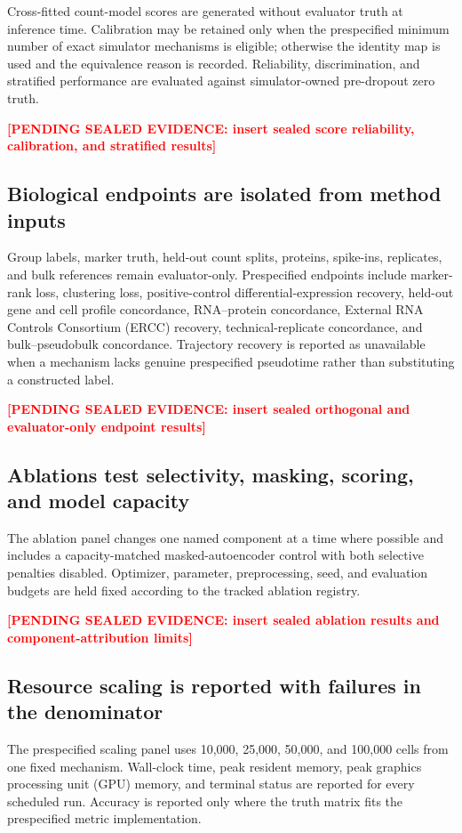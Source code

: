 \documentclass[pdflatex,sn-vancouver-num,referee,lineno]{sn-jnl}
\newcommand{\PendingResult}[1]{\textcolor{red}{\textbf{[PENDING SEALED EVIDENCE: #1]}}}
\begin{document}
Cross-fitted count-model scores are generated without evaluator truth at inference time. Calibration may be retained only when the prespecified minimum number of exact simulator mechanisms is eligible; otherwise the identity map is used and the equivalence reason is recorded. Reliability, discrimination, and stratified performance are evaluated against simulator-owned pre-dropout zero truth.

\PendingResult{insert sealed score reliability, calibration, and stratified results}

\subsection{Biological endpoints are isolated from method inputs}

Group labels, marker truth, held-out count splits, proteins, spike-ins, replicates, and bulk references remain evaluator-only. Prespecified endpoints include marker-rank loss, clustering loss, positive-control differential-expression recovery, held-out gene and cell profile concordance, RNA--protein concordance, External RNA Controls Consortium (ERCC) recovery, technical-replicate concordance, and bulk--pseudobulk concordance. Trajectory recovery is reported as unavailable when a mechanism lacks genuine prespecified pseudotime rather than substituting a constructed label.

\PendingResult{insert sealed orthogonal and evaluator-only endpoint results}

\subsection{Ablations test selectivity, masking, scoring, and model capacity}

The ablation panel changes one named component at a time where possible and includes a capacity-matched masked-autoencoder control with both selective penalties disabled. Optimizer, parameter, preprocessing, seed, and evaluation budgets are held fixed according to the tracked ablation registry.

\PendingResult{insert sealed ablation results and component-attribution limits}

\subsection{Resource scaling is reported with failures in the denominator}

The prespecified scaling panel uses 10,000, 25,000, 50,000, and 100,000 cells from one fixed mechanism. Wall-clock time, peak resident memory, peak graphics processing unit (GPU) memory, and terminal status are reported for every scheduled run. Accuracy is reported only where the truth matrix fits the prespecified metric implementation.
\end{document}
